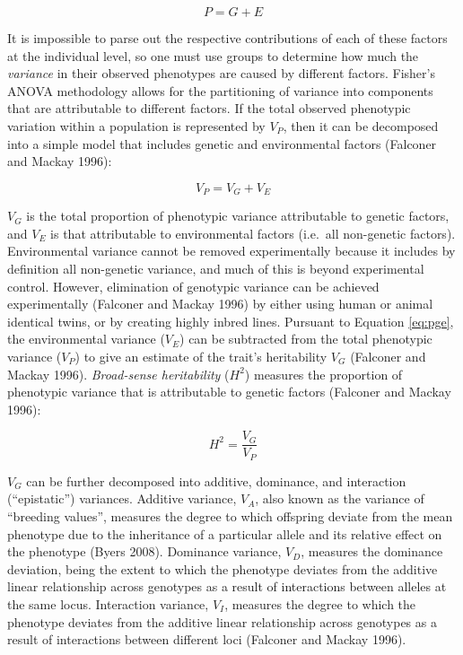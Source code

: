 \documentclass[
]{book}
\begin{document}
\begin{equation}
P = G + E \label{eq:pge-simp}
\end{equation}

It is impossible to parse out the respective contributions of each of these factors at the individual level, so one must use groups to determine how much the \emph{variance} in their observed phenotypes are caused by different factors. Fisher's ANOVA methodology allows for the partitioning of variance into components that are attributable to different factors. If the total observed phenotypic variation within a population is represented by \(V_{P}\), then it can be decomposed into a simple model that includes genetic and environmental factors (Falconer and Mackay 1996):

\begin{equation}
V_{P} = V_{G} + V_{E} \label{eq:pge}
\end{equation}

\(V_{G}\) is the total proportion of phenotypic variance attributable to genetic factors, and \(V_{E}\) is that attributable to environmental factors (i.e.~all non-genetic factors). Environmental variance cannot be removed experimentally because it includes by definition all non-genetic variance, and much of this is beyond experimental control. However, elimination of genotypic variance can be achieved experimentally (Falconer and Mackay 1996) by either using human or animal identical twins, or by creating highly inbred lines. Pursuant to Equation \eqref{eq:pge}, the environmental variance (\(V_E\)) can be subtracted from the total phenotypic variance (\(V_P\)) to give an estimate of the trait's heritability \(V_G\) (Falconer and Mackay 1996). \emph{Broad-sense heritability} (\(H^2\)) measures the proportion of phenotypic variance that is attributable to genetic factors (Falconer and Mackay 1996):

\begin{equation}
H^2 = \frac{V_G}{V_P} \label{eq:heritbs}
\end{equation}

\(V_{G}\) can be further decomposed into additive, dominance, and interaction (``epistatic'') variances. Additive variance, \(V_A\), also known as the variance of ``breeding values'', measures the degree to which offspring deviate from the mean phenotype due to the inheritance of a particular allele and its relative effect on the phenotype (Byers 2008). Dominance variance, \(V_D\), measures the dominance deviation, being the extent to which the phenotype deviates from the additive linear relationship across genotypes as a result of interactions between alleles at the same locus. Interaction variance, \(V_I\), measures the degree to which the phenotype deviates from the additive linear relationship across genotypes as a result of interactions between different loci (Falconer and Mackay 1996).
\end{document}
